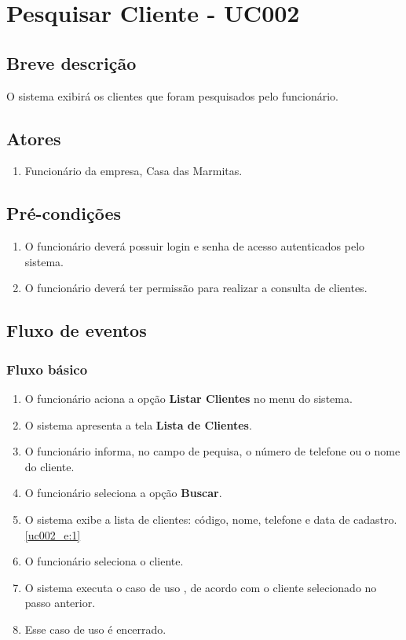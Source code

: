 \chapter{Pesquisar Cliente - UC002} \label{uc002}

\section{Breve descrição}

O sistema exibirá os clientes que foram pesquisados pelo funcionário.

\section{Atores}

\begin{enumerate}
	\item Funcionário da empresa, Casa das Marmitas.
\end{enumerate}

\section{Pré-condições}

\begin{enumerate}
	\item O funcionário deverá possuir login e senha de acesso autenticados pelo sistema.
	\item O funcionário deverá ter permissão para realizar a consulta de clientes.
\end{enumerate}

\section{Fluxo de eventos}

\subsection{Fluxo básico}

\begin{enumerate}[label=P\arabic*]
	\item O funcionário aciona a opção \textbf{Listar Clientes} no menu do sistema.
	\item O sistema apresenta a tela \textbf{Lista de Clientes}. \label{uc002_p:2}	
	\item O funcionário informa, no campo de pequisa, o número de telefone ou o nome do cliente.
	\item O funcionário seleciona a opção \textbf{Buscar}. \label{uc002_p:4}
	\item O sistema exibe a lista de clientes: código, nome, telefone e data de cadastro. \label{uc002_p:5}\ref{uc002_e:1}
	\item O funcionário seleciona o cliente.
	\item O sistema executa o caso de uso , de acordo com o cliente selecionado no passo anterior.
	\item Esse caso de uso é encerrado.
\end{enumerate}

